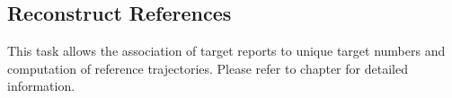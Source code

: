 \subsection{Reconstruct References}
\label{sec:ui_proc_reconst_references}

This task allows the association of target reports to unique target numbers and computation of reference trajectories. 
Please refer to chapter  for detailed information.
